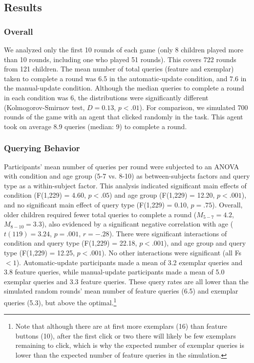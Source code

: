 \documentclass[man,floatsintext]{apa6}
\begin{document}
\subsection{Results}
\subsubsection{Overall}

We analyzed only the first 10 rounds of each game (only 8 children played more than 
10 rounds, including one who played 51 rounds). This covers 722 rounds from 121 
children. The mean number of total queries (feature and exemplar) taken to complete a round was 6.5 in the automatic-update condition, 
and 7.6 in the manual-update condition. Although the median queries to complete a round in each 
condition was 6, the distributions were significantly different (Kolmogorov-Smirnov test, $D = 
0.13$, $p<.01$). For comparison, we simulated 700 rounds of the game with an agent that clicked
randomly in the task.  This agent took on average 8.9 queries (median: 9) to complete a
round.  %


\subsubsection{Querying Behavior}

Participants' mean number of queries per round were subjected to an 
ANOVA with condition and age group (5-7 vs. 8-10) as between-subjects factors and query type as a within-subject factor. This analysis indicated significant main effects of condition (F(1,229) = 4.60, $p<.05$) and age group (F(1,229) = 12.20, $p<.001$), and no significant main effect of query type (F(1,229) = 0.10, $p=.75$). Overall, older children required fewer total queries to complete a round ($M_{5-7} = 4.2$, $M_{8-10} = 3.3$),
also evidenced by a significant negative correlation with age ($t(119) = 3.24$, $p=.001$, $r=-.28$). There were significant interactions of condition and query type (F(1,229) = 22.18, 
$p<.001$), and age group and query type (F(1,229) = 12.25, $p<.001$). No other interactions were significant (all Fs $<1$). Automatic-update participants made a mean of 3.2 exemplar queries and 3.8 feature queries, while manual-update participants made a mean of 5.0 exemplar queries and 3.3 feature queries.
These query rates are all lower than the simulated random rounds' mean number of feature queries (6.5) and exemplar queries (5.3), but above the optimal.\footnote{Note that although there are at first more exemplars (16) than 
feature buttons (10), after the first click or two there will likely be few 
exemplars remaining to click, which is why the expected number of exemplar 
queries is lower than the expected number of feature queries in the simulation.} 
\end{document}
